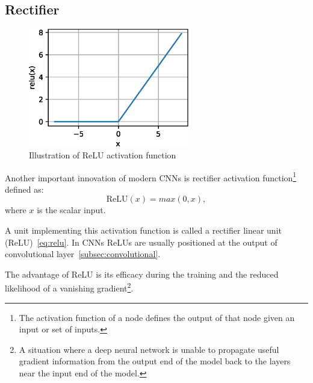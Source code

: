 \subsection{Rectifier}\label{subsec:rectifier}

\begin{figure}
    \label{fig:relu}
    \includegraphics[width=7cm]{images/cnn/relu.eps}
    \caption{Illustration of ReLU activation function~\cite{ReLU}}
\end{figure}

Another important innovation of modern CNNs is rectifier activation function\footnote{The activation function of
a node defines the output of that node given an input or set of inputs.} defined as:
\begin{equation}
    \label{eq:relu}
    \mathrm{ReLU}(x) = max(0,x),
\end{equation}
where $x$ is the scalar input.

A unit implementing this activation function is called a rectifier linear unit (ReLU)~\ref{eq:relu}.
In CNNs ReLUs are usually positioned at the output of convolutional layer~\ref{subsec:convolutional}.

The advantage of ReLU is its efficacy during the training and the reduced likelihood of a vanishing
gradient\footnote{\label{foot:vangrad}A situation where a deep neural network is unable to propagate useful gradient
information from the output end of the model back to the layers near the input end of the model.}.

